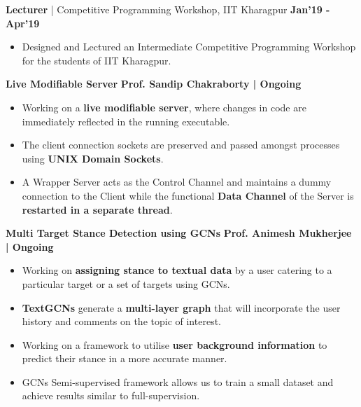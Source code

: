 \documentclass[10pt]{article}
\begin{document}
\large { \textbf{Lecturer} | Competitive Programming Workshop, IIT Kharagpur} \normalsize
\href{https://github.com/shmundhra/Credentials/tree/master/Teaching\%20Ventures} {\hspace{0.5ex}\faMousePointer}
{\hfill} \textbf{Jan'19 - Apr'19}\\[-1.9em]
\begin{itemize}
    \item Designed and Lectured an Intermediate Competitive Programming Workshop for the students of IIT Kharagpur.\\[-2em]
\end{itemize}

\vspace{-0.5ex}
\spacedhrule{0.15ex}{1.0ex}
\large {\textbf{Live Modifiable Server}} \normalsize \href{}{} {\hfill} \textbf{Prof. Sandip Chakraborty | Ongoing}\\[-1.75em]
\begin{itemize}
    \item Working on a \textbf{live modifiable server}, where changes in code are immediately reflected in the running executable.\\[-1.9em]
    \item The client connection sockets are preserved and passed amongst processes using \textbf{UNIX Domain Sockets}.\\[-1.9em]
    \item A Wrapper Server acts as the Control Channel and maintains a dummy connection to the Client while the functional \textbf{Data Channel} of the Server is \textbf{restarted in a separate thread}.\\[-1em]
\end{itemize}
\large {\textbf{Multi Target Stance Detection using GCNs}} \normalsize \href{}{} {\hfill} \textbf{Prof. Animesh Mukherjee | Ongoing}\\[-1.75em]
\begin{itemize}
    \item Working on \textbf{assigning stance to textual data} by a user catering to a particular target or a set of targets using GCNs.\\[-1.9em]
    \item \textbf{TextGCNs} generate a \textbf{multi-layer graph} that will incorporate the user history and comments on the topic of interest.\\[-1.9em]
    \item Working on a framework to utilise \textbf{user background information} to predict their stance in a more accurate manner. \\[-1.9em]
    \item GCNs {Semi-supervised framework} allows us to train a small dataset and achieve results similar to full-supervision.\\[-1em]
\end{itemize}
\end{document}
